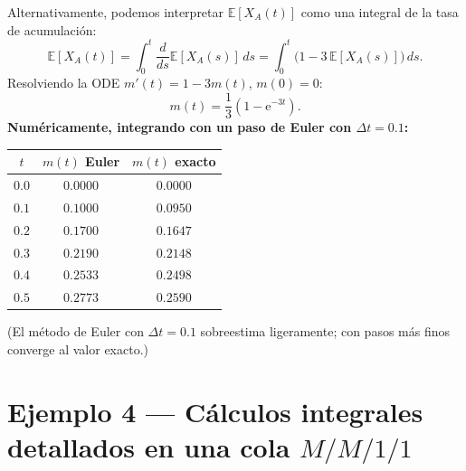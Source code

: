 \documentclass[11pt,a4paper]{article}
\theoremstyle{definition}
\theoremstyle{remark}
\newcommand{\E}{\mathbb{E}}
\newcommand{\e}{\mathrm{e}}
\begin{document}
\begin{ejemplo}
Alternativamente, podemos interpretar $\E[X_A(t)]$ como una integral de
la tasa de acumulación:
\[
  \E[X_A(t)] = \int_0^{t}\frac{d}{ds}\E[X_A(s)]\,ds
  = \int_0^{t}\bigl(1 - 3\,\E[X_A(s)]\bigr)\,ds.
\]
Resolviendo la ODE $m'(t) = 1-3m(t)$, $m(0)=0$:
\[
  m(t) = \frac{1}{3}(1-\e^{-3t}).
\]
\textbf{Numéricamente, integrando con un paso de Euler con $\Delta t=0.1$:}
\begin{center}
\begin{tabular}{ccc}
\toprule
$t$ & $m(t)$ Euler & $m(t)$ exacto \\
\midrule
$0.0$ & $0.0000$ & $0.0000$ \\
$0.1$ & $0.1000$ & $0.0950$ \\
$0.2$ & $0.1700$ & $0.1647$ \\
$0.3$ & $0.2190$ & $0.2148$ \\
$0.4$ & $0.2533$ & $0.2498$ \\
$0.5$ & $0.2773$ & $0.2590$ \\
\bottomrule
\end{tabular}
\end{center}
(El método de Euler con $\Delta t = 0.1$ sobreestima ligeramente; con
pasos más finos converge al valor exacto.)
\end{ejemplo}

\section{Ejemplo 4 --- Cálculos integrales detallados en una cola $M/M/1/1$}
\end{document}
